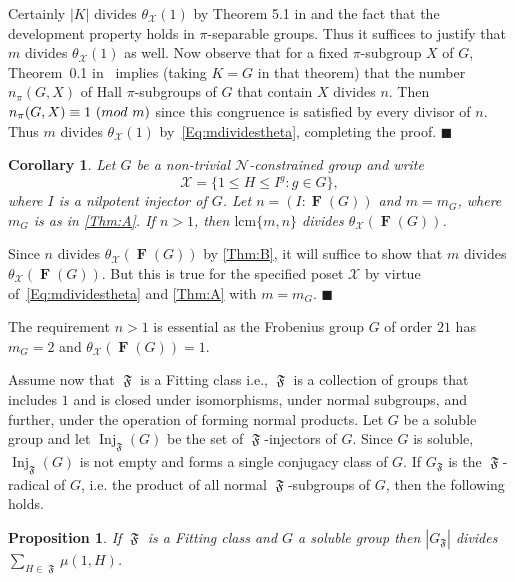 \documentclass[10pt,a4paper]{amsart}
\numberwithin{equation}{section}
\DeclareMathOperator{\FF}{\mathfrak{F}}
\DeclareMathOperator{\fitt}{\mathbf{F}}
\DeclareMathOperator{\inj}{Inj}
\newcommand{\card}[1]{\left\lvert{#1}\right\rvert}
\renewcommand{\leq}{\leqslant}
\newcommand{\md}[1]{\,\left(\textnormal{mod}\ #1\right)}
\newenvironment{proofof}{{\bf {Proof.} }}{\hfill $\blacksquare$ \\}
\newtheorem{proposition}[theorem]{Proposition}
\newtheorem{corollary}[theorem]{Corollary}
\begin{document}
\begin{proofof}
Certainly $\card{K}$ divides $\theta_{\mathcal{X}}(1)$
by Theorem 5.1 in \cite{mobius} and the fact that the development
property holds in $\pi$-separable groups.
Thus it suffices to justify that $m$ divides $\theta_{\mathcal{X}}(1)$ as well.
Now observe that for a fixed $\pi$-subgroup $X$ of $G$,
Theorem~0.1 in~\cite{arithmetical_questions} implies (taking $K = G$ in that theorem) 
that the number $n_{\pi}(G, X)$ of Hall $\pi$-subgroups of $G$ that contain $X$ divides $n$.
Then $n_{\pi}(G, X) \equiv 1 \md{m}$ 
since this congruence is satisfied by every divisor of $n$.
Thus $m$ divides $\theta_{\mathcal{X}}(1)$ by~\eqref{Eq:mdividestheta}, 
completing the proof.
\end{proofof}


\begin{corollary}\label{Cor:Third}
Let $G$ be a non-trivial $\mathcal{N}$-constrained group 
and write
\[
\mathcal{X} = \{1 \leq H \leq I^g : g \in G\},
\]
where $I$ is a nilpotent injector of $G$.
Let $n = (I : \fitt(G))$ and $m = m_G$,
where $m_G$ is as in \autoref{Thm:A}.
If $n > 1$, then $\mathrm{lcm}\{m,n\}$ divides $\theta_{\mathcal{X}}(\fitt(G))$.
\end{corollary}

\begin{proofof}
Since $n$ divides $\theta_{\mathcal{X}}(\fitt(G))$ by \autoref{Thm:B},
it will suffice to show that $m$ divides $\theta_{\mathcal{X}}(\fitt(G))$.
But this is true for the specified poset $\mathcal{X}$ by virtue of~\eqref{Eq:mdividestheta}
and \autoref{Thm:A} with $m = m_G$.
\end{proofof}

The requirement $n > 1$ is essential as the Frobenius group $G$ of order $21$ 
has $m_G = 2$ and $\theta_{\mathcal{X}}(\fitt(G)) = 1$.




Assume now that $\FF$ is a Fitting class
i.e.,  $\FF$ is  a collection of groups that includes $1$ and is closed under isomorphisms, under normal subgroups, and further, under the operation of forming normal products. 
Let $G$ be  a soluble group and let $\inj_{\FF}(G)$ be the set of $\FF$-injectors of $G$. 
Since $G$ is soluble, $\inj_{\FF}(G)$ is not empty and forms a single conjugacy class of $G$. 
If $G_{\FF}$ is the $\FF$-radical of $G$, 
i.e. the product of all normal $\FF$-subgroups of $G$, 
then the following holds.

\begin{proposition}
If $\FF$ is a Fitting class  and  $G$ a soluble group then   
$\card{G_{\FF}}$ divides $\sum_{H \in \FF} \mu(1, H)$.
\end{proposition}
\end{document}
